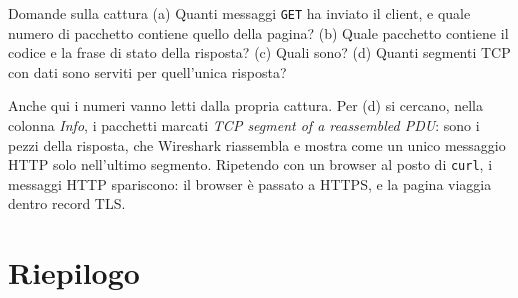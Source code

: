 \begin{esercizio}{Domande sulla cattura}
(a) Quanti messaggi \texttt{GET} ha inviato il client, e quale numero di pacchetto contiene quello della pagina?
(b) Quale pacchetto contiene il codice e la frase di stato della risposta? (c) Quali sono?
(d) Quanti segmenti TCP con dati sono serviti per quell'unica risposta?

\svolgimento
Anche qui i numeri vanno letti dalla propria cattura. Per (d) si cercano, nella colonna \emph{Info}, i pacchetti
marcati \emph{TCP segment of a reassembled PDU}: sono i pezzi della risposta, che Wireshark riassembla e mostra
come un unico messaggio HTTP solo nell'ultimo segmento. Ripetendo con un browser al posto di \texttt{curl}, i
messaggi HTTP spariscono: il browser è passato a HTTPS, e la pagina viaggia dentro record TLS.
\end{esercizio}

\section{Riepilogo}

